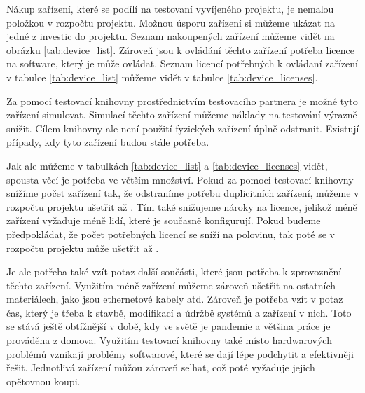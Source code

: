 Nákup zařízení, které se podílí na testovaní vyvíjeného projektu, je nemalou položkou v rozpočtu projektu. Možnou úsporu zařízení si můžeme ukázat na jedné z investic do projektu. Seznam nakoupených zařízení můžeme vidět na obrázku \ref{tab:device_list}. Zároveň jsou k ovládání těchto zařízení potřeba licence na software, který je může ovládat. Seznam licencí potřebných k ovládaní zařízení v tabulce \ref{tab:device_list} můžeme vidět v tabulce \ref{tab:device_licenses}. 

Za pomocí testovací knihovny prostřednictvím testovacího partnera je možné tyto zařízení simulovat. Simulací těchto zařízení můžeme náklady na testování výrazně snížit. Cílem knihovny ale není použití fyzických zařízení úplně odstranit. Existují případy, kdy tyto zařízení budou stále potřeba. 

Jak ale můžeme v tabulkách \ref{tab:device_list} a \ref{tab:device_licenses} vidět, spousta věcí je potřeba ve větším množství. Pokud za pomoci testovací knihovny snížíme počet zařízení tak, že odstraníme potřebu duplicitních zařízení, můžeme v rozpočtu projektu ušetřit až . Tím také snižujeme nároky na licence, jelikož méně zařízení vyžaduje méně lidí, které je současně konfigurují. Pokud budeme předpokládat, že počet potřebných licencí se sníží na polovinu, tak poté se v rozpočtu projektu může ušetřit až .

Je ale potřeba také vzít potaz další součásti, které jsou potřeba k zprovoznění těchto zařízení. Využitím méně zařízení můžeme zároveň ušetřit na ostatních materiálech, jako jsou ethernetové kabely atd. Zároveň je potřeba vzít v potaz čas, který je třeba k stavbě, modifikací a údržbě systémů a zařízení v nich. Toto se stává ještě obtížnější v době, kdy ve světě je pandemie a většina práce je prováděna z domova. Využitím testovací knihovny také místo hardwarových problémů vznikají problémy softwarové, které se dají lépe podchytit a efektivněji řešit.
Jednotlivá zařízení můžou zároveň selhat, což poté vyžaduje jejich opětovnou koupi.







